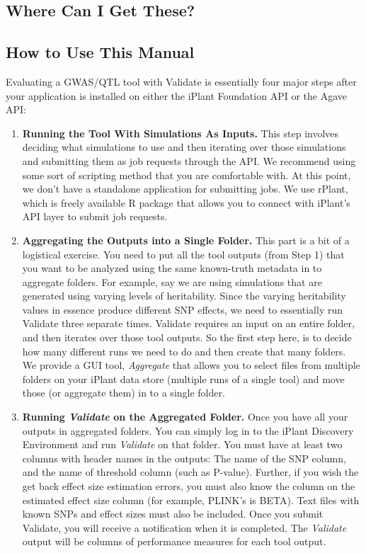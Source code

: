 \documentclass[twoside,a4paper]{refart}
\begin{document}
\subsection{Where Can I Get These?}

\subsection{How to Use This Manual}

Evaluating a GWAS/QTL tool with Validate is essentially four major steps after your application is installed on either the iPlant Foundation API or the Agave API:
\begin{enumerate}
\item \textbf{Running the Tool With Simulations As Inputs.}
This step involves deciding what simulations to use and then iterating over those simulations and submitting them as job requests through the API. We recommend using some sort of scripting method that you are comfortable with. At this point, we don't have a standalone application for submitting jobs. We use rPlant, which is freely available R package that allows you to connect with iPlant's API layer to submit job requests.
\item \textbf{Aggregating the Outputs into a Single Folder.}
This part is a bit of a logistical exercise. You need to put all the tool outputs (from Step 1) that you want to be analyzed using the same known-truth metadata in to aggregate folders. For example, say we are using simulations that are generated using varying levels of heritability. Since the varying heritability values in essence produce different SNP effects, we need to essentially run Validate three separate times. Validate requires an input on an entire folder, and then iterates over those tool outputs. So the first step here, is to decide how many different runs we need to do and then create that many folders. We provide a GUI tool, \textit{Aggregate} that allows you to select files from multiple folders on your iPlant data store (multiple runs of a single tool) and move those (or aggregate them) in to a single folder.
\item \textbf{Running \textit{Validate} on the Aggregated Folder.}
Once you have all your outputs in aggregated folders. You can simply log in to the iPlant Discovery Environment and run \textit{Validate} on that folder. You must have at least two columns with header names in the outputs: The name of the SNP column, and the name of threshold column (such as P-value). Further, if you wish the get back effect size estimation errors, you must also know the column on the estimated effect size column (for example, PLINK's is BETA). Text files with known SNPs and effect sizes must also be included. Once you submit Validate, you will receive a notification when it is completed. The \textit{Validate} output will be columns of performance measures for each tool output.

\end{enumerate}
\end{document}
